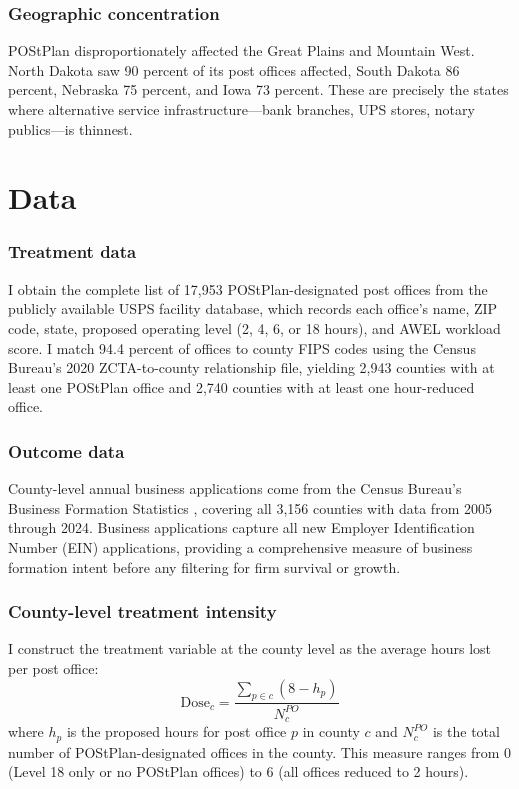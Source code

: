 \documentclass[12pt]{article}
\begin{document}
\subsubsection*{Geographic concentration} POStPlan disproportionately affected the Great Plains and Mountain West. North Dakota saw 90 percent of its post offices affected, South Dakota 86 percent, Nebraska 75 percent, and Iowa 73 percent. These are precisely the states where alternative service infrastructure---bank branches, UPS stores, notary publics---is thinnest.

\section{Data}

\subsubsection*{Treatment data} I obtain the complete list of 17,953 POStPlan-designated post offices from the publicly available USPS facility database, which records each office's name, ZIP code, state, proposed operating level (2, 4, 6, or 18 hours), and AWEL workload score. I match 94.4 percent of offices to county FIPS codes using the Census Bureau's 2020 ZCTA-to-county relationship file, yielding 2,943 counties with at least one POStPlan office and 2,740 counties with at least one hour-reduced office.

\subsubsection*{Outcome data} County-level annual business applications come from the Census Bureau's Business Formation Statistics \citep{census2024bfs}, covering all 3,156 counties with data from 2005 through 2024. Business applications capture all new Employer Identification Number (EIN) applications, providing a comprehensive measure of business formation intent before any filtering for firm survival or growth.

\subsubsection*{County-level treatment intensity} I construct the treatment variable at the county level as the average hours lost per post office:
\begin{equation}
\text{Dose}_c = \frac{\sum_{p \in c} (8 - h_p)}{N_c^{PO}}
\end{equation}
where $h_p$ is the proposed hours for post office $p$ in county $c$ and $N_c^{PO}$ is the total number of POStPlan-designated offices in the county. This measure ranges from 0 (Level 18 only or no POStPlan offices) to 6 (all offices reduced to 2 hours).
\end{document}
